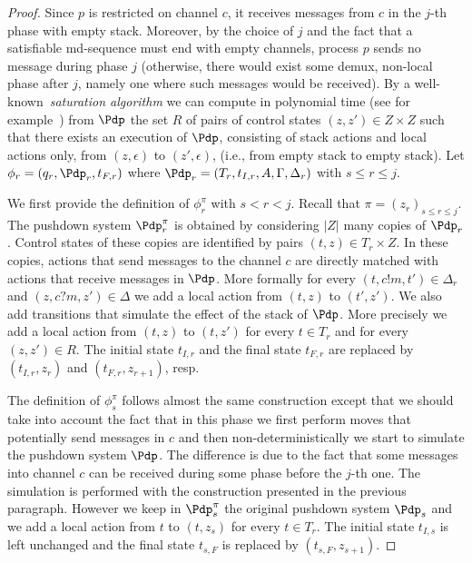 \documentclass{LMCS}
\begin{document}
\begin{proof}
  Since $p$ is restricted on channel $c$, it
  receives messages from $c$ in the $j$-th phase with empty
  stack. Moreover, by the choice of $j$ and the fact that a
  satisfiable md-sequence must end with empty channels, process $p$
  sends no message during phase $j$ (otherwise, there would exist some
  demux, non-local phase after $j$, namely one where such messages
  would be received). By a well-known~\emph{saturation
    algorithm} we can compute in polynomial time (see for
    example~\cite{esparza}) from
  $\Pdp$ the set $R$ of pairs of control states $(z,z')\in Z\times Z$
  such that there exists an execution of $\Pdp$, consisting of stack
  actions and local actions only, from $(z,\epsilon)$ to $(z',\epsilon)$,
  (i.e., from empty stack to empty stack). Let
  $\phi_r=(q_r,\Pdp_r,t_{F,r})$ where
  $\Pdp_r=(T_r,t_{I,r},A,\Gamma,\Delta_r)$ with $s\leq r\leq j$.

  We first provide the definition of $\phi_r^\pi$ with $s<r<j$. Recall
  that $\pi=(z_r)_{s\leq r\leq j}$. The
  pushdown system $\Pdp_r^\pi$ is obtained by considering $|Z|$ many
  copies of $\Pdp_r$. Control states of these
  copies are identified by pairs $(t,z)\in T_r\times Z$. In these
  copies, actions that send messages to the channel $c$ are directly
  matched with actions that receive messages in $\Pdp$. More formally
  for every $(t,c!m,t')\in \Delta_r$ and $(z,c?m,z')\in\Delta$ we add
  a local action from $(t,z)$ to $(t',z')$. We also add transitions
  that simulate the effect of the stack of $\Pdp$. More precisely we
  add a local action from $(t,z)$ to $(t,z')$ for every $t\in T_r$ and
  for every $(z,z')\in R$. The initial state $t_{I,r}$ and the final
  state $t_{F,r}$ are replaced by $(t_{I,r},z_r)$ and
  $(t_{F,r},z_{r+1})$, resp.

  The definition of $\phi_s^\pi$ follows almost the same
  construction except that we should take into account the fact that
  in this phase we first perform moves that potentially send messages
  in $c$ and then non-deterministically we start to simulate the
  pushdown system $\Pdp$. The difference is due to the fact that
  some messages into channel $c$ can be received during some phase
  before the $j$-th one.  The simulation is performed with the
  construction presented in the previous paragraph. However we keep in
  $\Pdp_s^\pi$ the original pushdown system $\Pdp_s$ and we add a
  local action from $t$ to $(t,z_s)$ for every $t\in T_r$. The initial
  state $t_{I,s}$ is left unchanged and the final state $t_{s,F}$ is
  replaced by $(t_{s,F},z_{s+1})$.



\end{proof}
\end{document}
